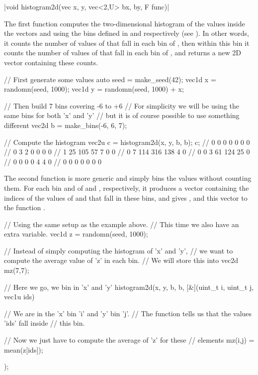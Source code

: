 \cppinline|void histogram2d(vec x, y, vec<2,U> bx, by, F func)|

The first  function computes the two-dimensional histogram of the values inside the vectors  and  using the bins defined in  and  respectively (see ). In other words, it counts the number of values of  that fall in each bin of , then within this bin it counts the number of values of  that fall in each bin of , and returns a new 2D vector containing these counts.

\begin{example}
\begin{cppcode}
// First generate some values
auto seed = make_seed(42);
vec1d x = randomn(seed, 1000);
vec1d y = randomn(seed, 1000) + x;

// Then build 7 bins covering -6 to +6
// For simplicity we will be using the same bins for both 'x' and 'y'
// but it is of course possible to use something different
vec2d b = make_bins(-6, 6, 7);

// Compute the histogram
vec2u c = histogram2d(x, y, b, b);
c;
//   0   0   0   0   0   0   0
//   0   3   2   0   0   0   0
//   1   25  105 57  7   0   0
//   0   7   114 316 138 4   0
//   0   0   3   61  124 25  0
//   0   0   0   0   4   4   0
//   0   0   0   0   0   0   0
\end{cppcode}
\end{example}

The second  function is more generic and simply bins the values without counting them. For each bin  and  of  and , respectively, it produces a vector containing the indices of the values of  and  that fall in these bins, and gives ,  and this vector to the function .

\begin{example}
\begin{cppcode}
// Using the same setup as the example above.
// This time we also have an extra variable.
vec1d z = randomn(seed, 1000);

// Instead of simply computing the histogram of 'x' and 'y',
// we want to compute the average value of 'z' in each bin.
// We will store this into
vec2d mz(7,7);

// Here we go, we bin in 'x' and 'y'
histogram2d(x, y, b, b, [&](uint_t i, uint_t j, vec1u ids) {
    // We are in the 'x' bin 'i' and 'y' bin 'j'.
    // The function tells us that the values 'ids' fall inside
    // this bin.

    // Now we just have to compute the average of 'z' for these
    // elements
    mz(i,j) = mean(z[ids]);
});
\end{cppcode}
\end{example}

